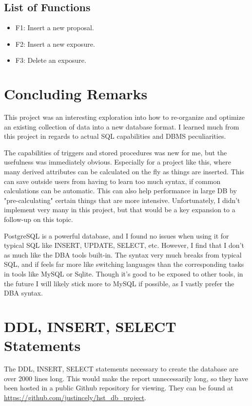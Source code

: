 \documentclass[a4paper,11pt]{article}
\begin{document}
\subsection{List of Functions}
\begin{itemize}
	\item F1: Insert a new proposal.
 	\item F2: Insert a new exposure.
 	\item F3: Delete an exposure.
\end{itemize}

\section{Concluding Remarks}
This project was an interesting exploration into how to re-organize and optimize an existing collection of data into a new database format.  I learned much from this project in regards to actual SQL capabilities and DBMS peculiarities.

The capabilities of triggers and stored procedures was new for me, but the usefulness was immediately obvious.  Especially for a project like this, where many derived attributes can be calculated on the fly as things are inserted.  This can save outside users from having to learn too much syntax, if common calculations can be automatic.  This can also help performance in large DB by "pre-calculating" certain things that are more intensive.  Unfortunately, I didn't implement very many in this project, but that would be a key expansion to a follow-up on this topic.  

PostgreSQL is a powerful database, and I found no issues when using it for typical SQL like INSERT, UPDATE, SELECT, etc.  However, I find that I don't as much like the DBA tools built-in.  The syntax very much breaks from typical SQL, and if feels far more like switching languages than the corresponding tasks in tools like MySQL or Sqlite.  Though it's good to be exposed to other tools, in the future I will likely stick more to MySQL if possible, as I vastly prefer the DBA syntax.  

\pagebreak

\appendix
\section{DDL, INSERT, SELECT Statements}
The DDL, INSERT, SELECT statements necessary to create the database are over 2000 lines long. This would make the report unnecessarily long, so they have been hosted in a public Github repository for viewing. They can be found at \href{https://github.com/justincely/hst\_db\_project}{https://github.com/justincely/hst\_db\_project}.
\end{document}
